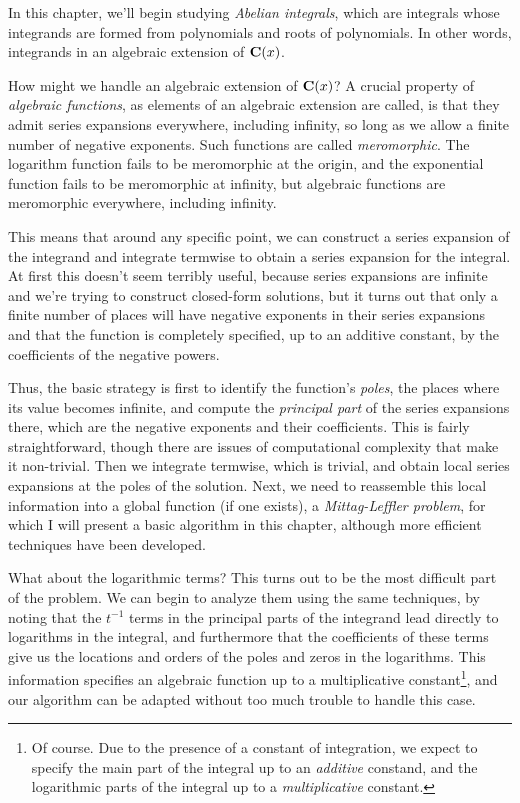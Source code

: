 In this chapter, we'll begin studying {\it Abelian integrals}, which
are integrals whose integrands are formed from polynomials and roots
of polynomials.  In other words, integrands in an algebraic extension
of ${\bf C}(x)$.

How might we handle an algebraic extension of ${\bf C}(x)$?  A crucial
property of {\it algebraic functions}, as elements of an algebraic
extension are called, is that they admit series expansions everywhere,
including infinity, so long as we allow a finite number of negative
exponents.  Such functions are called {\it meromorphic}.  The
logarithm function fails to be meromorphic at the origin, and the
exponential function fails to be meromorphic at infinity, but
algebraic functions are meromorphic everywhere, including infinity.

This means that around any specific point, we can construct a series
expansion of the integrand and integrate termwise to obtain a series
expansion for the integral.  At first this doesn't seem terribly
useful, because series expansions are infinite and we're trying to
construct closed-form solutions, but it turns out that only a finite
number of places will have negative exponents in their series
expansions and that the function is completely specified, up to an
additive constant, by the coefficients of the negative powers.

Thus, the basic strategy is first to identify the function's {\it
poles}, the places where its value becomes infinite, and compute the
{\it principal part} of the series expansions there, which are the
negative exponents and their coefficients.  This is fairly
straightforward, though there are issues of computational complexity
that make it non-trivial.  Then we integrate termwise, which is
trivial, and obtain local series expansions at the poles of the
solution.  Next, we need to reassemble this local information into a
global function (if one exists), a {\it Mittag-Leffler problem}, for
which I will present a basic algorithm in this chapter, although more
efficient techniques have been developed.

What about the logarithmic terms?  This turns out to be the most
difficult part of the problem.  We can begin to analyze them using the
same techniques, by noting that the $t^{-1}$ terms in the principal
parts of the integrand lead directly to logarithms in the integral,
and furthermore that the coefficients of these terms give us the
locations and orders of the poles and zeros in the logarithms.  This
information specifies an algebraic function up to a multiplicative
constant\footnote{Of course.  Due to the presence of a constant of
integration, we expect to specify the main part of the integral up to
an {\it additive} constand, and the logarithmic parts of the integral
up to a {\it multiplicative} constant.}, and our algorithm can be
adapted without too much trouble to handle this case.

